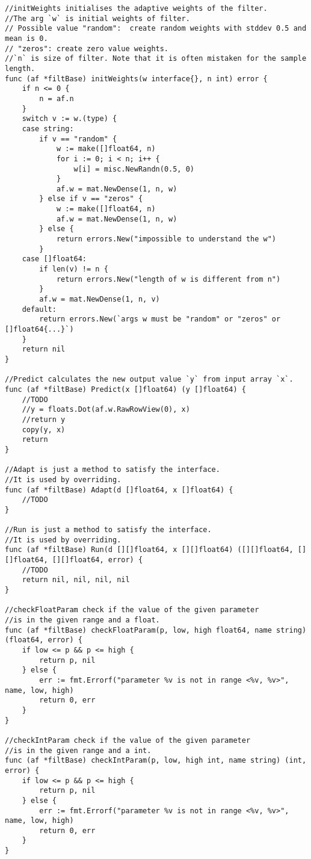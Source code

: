 \begin{lstlisting}[caption=fdadf/base.go,label=fdadf/base.go]
//initWeights initialises the adaptive weights of the filter.
//The arg `w` is initial weights of filter.
// Possible value "random":  create random weights with stddev 0.5 and mean is 0.
// "zeros": create zero value weights.
//`n` is size of filter. Note that it is often mistaken for the sample length.
func (af *filtBase) initWeights(w interface{}, n int) error {
    if n <= 0 {
        n = af.n
    }
    switch v := w.(type) {
    case string:
        if v == "random" {
            w := make([]float64, n)
            for i := 0; i < n; i++ {
                w[i] = misc.NewRandn(0.5, 0)
            }
            af.w = mat.NewDense(1, n, w)
        } else if v == "zeros" {
            w := make([]float64, n)
            af.w = mat.NewDense(1, n, w)
        } else {
            return errors.New("impossible to understand the w")
        }
    case []float64:
        if len(v) != n {
            return errors.New("length of w is different from n")
        }
        af.w = mat.NewDense(1, n, v)
    default:
        return errors.New(`args w must be "random" or "zeros" or []float64{...}`)
    }
    return nil
}

//Predict calculates the new output value `y` from input array `x`.
func (af *filtBase) Predict(x []float64) (y []float64) {
    //TODO
    //y = floats.Dot(af.w.RawRowView(0), x)
    //return y
    copy(y, x)
    return
}

//Adapt is just a method to satisfy the interface.
//It is used by overriding.
func (af *filtBase) Adapt(d []float64, x []float64) {
    //TODO
}

//Run is just a method to satisfy the interface.
//It is used by overriding.
func (af *filtBase) Run(d [][]float64, x [][]float64) ([][]float64, [][]float64, [][]float64, error) {
    //TODO
    return nil, nil, nil, nil
}

//checkFloatParam check if the value of the given parameter
//is in the given range and a float.
func (af *filtBase) checkFloatParam(p, low, high float64, name string) (float64, error) {
    if low <= p && p <= high {
        return p, nil
    } else {
        err := fmt.Errorf("parameter %v is not in range <%v, %v>", name, low, high)
        return 0, err
    }
}

//checkIntParam check if the value of the given parameter
//is in the given range and a int.
func (af *filtBase) checkIntParam(p, low, high int, name string) (int, error) {
    if low <= p && p <= high {
        return p, nil
    } else {
        err := fmt.Errorf("parameter %v is not in range <%v, %v>", name, low, high)
        return 0, err
    }
}


\end{lstlisting}
